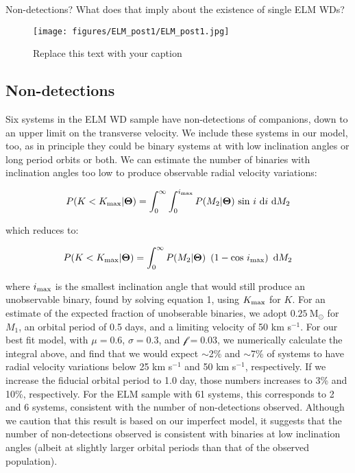 \documentclass[letterpaper,12pt,preprint]{aastex}
\newcommand{\Msun}{\mathrm{M}_\odot}
\begin{document}
Non-detections? What does that imply about the existence of single ELM WDs?




\begin{figure}[h!]
\begin{center}
\texttt{[image: figures/ELM\_post1/ELM\_post1.jpg]}
\caption{Replace this text with your caption}
\end{center}
\end{figure}



\subsection{Non-detections}

Six systems in the ELM WD sample have non-detections of companions, down to an upper limit on the transverse velocity. We include these systems in our model, too, as in principle they could be binary systems at with low inclination angles or long period orbits or both. We can estimate the number of binaries with inclination angles too low to produce observable radial velocity variations:

\begin{equation}
P(K<K_{\rm max} | \mathbf{\Theta}) = \int_0^{\infty} \int_0^{i_{\rm max}} P(M_2|\mathbf{\Theta})\ {\rm sin}\ i\ {\rm d}i\ {\rm d}M_2
\end{equation}

which reduces to:

\begin{equation}
P(K<K_{\rm max} | \mathbf{\Theta}) = \int_0^{\infty} P(M_2|\mathbf{\Theta})\ \left( 1 - {\rm cos}\ i_{\rm max}\right)\ {\rm d}M_2
\end{equation}

where $i_{\rm max}$ is the smallest inclination angle that would still produce an unobservable binary, found by solving equation 1, using $K_{\rm max}$ for $K$. For an estimate of the expected fraction of unobserable binaries, we adopt $0.25~\Msun$ for $M_1$, an orbital period of 0.5 days, and a limiting velocity of 50 km s$^{-1}$. For our best fit model, with $\mu=0.6$, $\sigma=0.3$, and $\mathcal{f}=0.03$, we numerically calculate the integral above, and find that we would expect $\sim$2\% and $\sim$7\% of systems to have radial velocity variations below 25 km s$^{-1}$ and 50 km s$^{-1}$, respectively. If we increase the fiducial orbital period to 1.0 day, those numbers increases to 3\% and 10\%, respectively. For the ELM sample with 61 systems, this corresponds to 2 and 6 systems, consistent with the number of non-detections observed. Although we caution that this result is based on our imperfect model, it suggests that the number of non-detections observed is consistent with binaries at low inclination angles (albeit at slightly larger orbital periods than that of the observed population).
\end{document}
